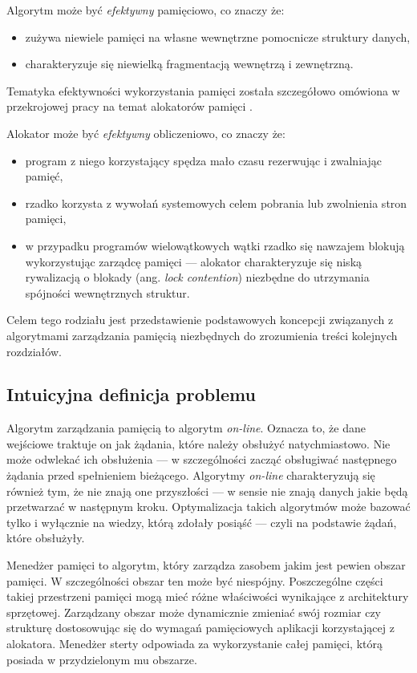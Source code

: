 \documentclass[12pt,a4paper,titlepage,twoside]{mwart}
\begin{document}
Algorytm może być \textit{efektywny} pamięciowo, co znaczy że:
\begin{itemize}
\item zużywa niewiele pamięci na własne wewnętrzne pomocnicze struktury danych,
\item charakteryzuje się niewielką fragmentacją wewnętrzą i zewnętrzną.
\end{itemize}
Tematyka efektywności wykorzystania pamięci została szczegółowo omówiona w
przekrojowej pracy na temat alokatorów pamięci \cite{paul95dynamic}.

Alokator może być \textit{efektywny} obliczeniowo, co znaczy że:
\begin{itemize}
\item program z niego korzystający spędza mało czasu rezerwując i zwalniając
pamięć,
\item rzadko korzysta z wywołań systemowych celem pobrania lub zwolnienia stron
pamięci,
\item w przypadku programów wielowątkowych wątki rzadko się nawzajem blokują
wykorzystując zarządcę pamięci --- alokator charakteryzuje się niską
rywalizacją o blokady (ang. \textit{lock contention}) niezbędne do utrzymania
spójności wewnętrznych struktur.
\end{itemize}

Celem tego rodziału jest przedstawienie podstawowych koncepcji związanych z
algorytmami zarządzania pamięcią niezbędnych do zrozumienia treści kolejnych
rozdziałów. 

\subsection{Intuicyjna definicja problemu}

Algorytm zarządzania pamięcią to algorytm \textit{on-line}. Oznacza to, że dane
wejściowe traktuje on jak żądania, które należy obsłużyć natychmiastowo. Nie
może odwlekać ich obsłużenia --- w szczególności zacząć obsługiwać następnego
żądania przed spełnieniem bieżącego. Algorytmy \textit{on-line} charakteryzują
się również tym, że nie znają one przyszłości --- w sensie nie znają danych
jakie będą przetwarzać w następnym kroku. Optymalizacja takich algorytmów może
bazować tylko i wyłącznie na wiedzy, którą zdołały posiąść --- czyli na
podstawie żądań, które obsłużyły.

Menedżer pamięci to algorytm, który zarządza zasobem jakim jest pewien obszar
pamięci. W szczególności obszar ten może być niespójny. Poszczególne części
takiej przestrzeni pamięci mogą mieć różne właściwości wynikające z
architektury sprzętowej. Zarządzany obszar może dynamicznie zmieniać swój
rozmiar czy strukturę dostosowując się do wymagań pamięciowych aplikacji
korzystającej z alokatora. Menedżer sterty odpowiada za wykorzystanie całej
pamięci, którą posiada w przydzielonym mu obszarze.
\end{document}
